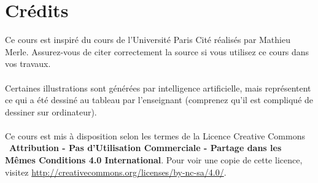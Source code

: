 \documentclass{article}
\begin{document}

\newpage
\tableofcontents
\section*{Crédits}
Ce cours est inspiré du cours de l'Université Paris Cité réalisés par Mathieu Merle. Assurez-vous de citer correctement la source si vous utilisez ce cours dans vos travaux.\\\\
Certaines illustrations sont générées par intelligence artificielle, mais représentent ce qui a été dessiné au tableau par l'enseignant (comprenez qu'il est compliqué de dessiner sur ordinateur).\\\\
Ce cours est mis à disposition selon les termes de la Licence Creative Commons \ccbyncsa\ \textbf{Attribution - Pas d'Utilisation Commerciale - Partage dans les Mêmes Conditions 4.0 International}. 
Pour voir une copie de cette licence, visitez \url{http://creativecommons.org/licenses/by-nc-sa/4.0/}.
\end{document}
